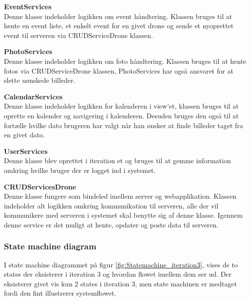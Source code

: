 \textbf{EventServices}\\
Denne klasse indeholder logikken om event håndtering. Klassen bruges til at hente en event liste, et enkelt event for en givet drone og sende et nyoprettet event til serveren via CRUDServiceDrone klassen.

\textbf{PhotoServices}\\
Denne klasse indeholder logikken om foto håndtering. Klassen bruges til at hente fotos via CRUDServiceDrone klassen, PhotoServices har også ansvaret for at slette uønskede billeder.

\textbf{CalendarServices}\\
Denne klasse indeholder logikken for kalenderen i view'et, klassen bruges til at oprette en kalender og navigering i kalenderen. Desuden bruges den også til at fortælle hvilke dato brugeren har valgt når han ønsker at finde billeder taget fra en givet dato.

\newpage

\textbf{UserServices}\\
Denne klasse blev oprettet i iteration et og bruges til at gemme information omkring hvilke bruger der er logget ind i systemet.

\textbf{CRUDServicesDrone}\\
Denne klasse fungere som bindeled imellem server og webapplikation. Klassen indeholder alt logikken omkring kommunikation til serveren, alle der vil kommunikere med serveren i systemet skal benytte sig af denne klasse. Igennem denne service er det muligt at hente, opdater og poste data til serveren.

\vspace{0.3cm}

\subsubsection*{State machine diagram}
\vspace{-0.3cm}
I state machine diagrammet på figur \ref{fig:Statemachine_iteration3}, vises de to states der eksisterer i iteration 3 og hvordan flowet imellem dem ser ud. Der eksisterer givet vis kun 2 states i iteration 3, men state machinen er medtaget fordi den fint illustrerer systemflowet.

